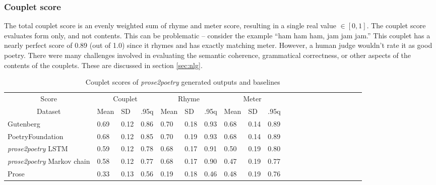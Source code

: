\documentclass[11pt,a4paper]{article}
\begin{document}
\subsubsection{Couplet score}
\label{sec:coupletscore}

The total couplet score is an evenly weighted sum of rhyme and meter score, resulting in a single real value $\in [0, 1]$.
 The couplet score evaluates form only, and not contents. This can be problematic -- consider the example ``ham ham ham, jam jam jam.'' This couplet has a nearly perfect score of 0.89 (out of 1.0) since it rhymes and has exactly matching meter. However, a human judge wouldn't rate it as good poetry. There were many challenges involved in evaluating the semantic coherence, grammatical correctness, or other aspects of the contents of the couplets. These are discussed in section \ref{sec:nlg}.

\begin{table}[ht]
\begin{tabular}{|l|l|l|l|l|l|l|l|l|l|l|c|c|c|c|c|c|c|c|c|c|}
\hline\hline
\multicolumn{1}{|c|}{Score} & \multicolumn{3}{c|}{Couplet} & \multicolumn{3}{c|}{Rhyme} & \multicolumn{3}{c|}{Meter}\\
\cline{1-10}
\multicolumn{1}{|c|}{Dataset} & Mean & SD & .95q & Mean & SD & .95q & Mean & SD & .95q \\
\hline\hline
Gutenberg & 0.69 & 0.12 & 0.86 & 0.70 & 0.18 & 0.93 & 0.68 & 0.14 & 0.89 \\ [0.5ex]
\hline
PoetryFoundation & 0.68 & 0.12 & 0.85 & 0.70 & 0.19 & 0.93 & 0.68 & 0.14 & 0.89 \\ [0.5ex]
\hline
\textit{prose2poetry} LSTM & 0.59 & 0.12 & 0.78 & 0.68 & 0.17 & 0.91 & 0.50 & 0.19 & 0.80 \\ [0.5ex]
\hline
\textit{prose2poetry} Markov chain & 0.58 & 0.12 & 0.77 & 0.68 & 0.17 & 0.90 & 0.47 & 0.19 & 0.77 \\ [0.5ex]
\hline
Prose & 0.33 & 0.13 & 0.56 & 0.19 & 0.18 & 0.46 & 0.48 & 0.19 & 0.76 \\ [0.5ex]
\hline
\end{tabular}

\caption{Couplet scores of \textit{prose2poetry} generated outputs and baselines}
\label{table:couplet_results}
\end{table}
\end{document}
